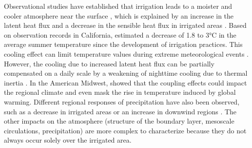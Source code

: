 Observational studies have established that irrigation leads to a moister and cooler atmosphere near the surface \citep{bonfils_empirical_2007, mcdermid_irrigation_2023}, which is explained by an increase in the latent heat flux and a decrease in the sensible heat flux in irrigated areas \citep{rappin_landatmosphere_2022, boone_land_2025}.
Based on observation records in California, \citet{bonfils_empirical_2007} estimated a decrease of 1.8 to 3°C in the average summer temperature since the development of irrigation practices. This cooling effect can limit temperature values during extreme meteorological events \citep{thiery_present-day_2017, thiery_warming_2020}. However, the cooling due to increased latent heat flux can be partially compensated on a daily scale by a weakening of nighttime cooling due to thermal inertia \citep{chen_irrigation_2018}.
In the American Midwest, \cite{nocco_observation_2019} showed that the coupling effects could impact the regional climate and even mask the rise in temperature induced by global warming. Different regional responses of precipitation have also been observed, such as a decrease in irrigated areas \citep{alter_rainfall_2015} or an increase in downwind regions \citep{deangelis_evidence_2010}.
The other impacts on the atmosphere (structure of the boundary layer, mesoscale circulations, precipitation) are more complex to characterize because they do not always occur solely over the irrigated area.

\hfill

